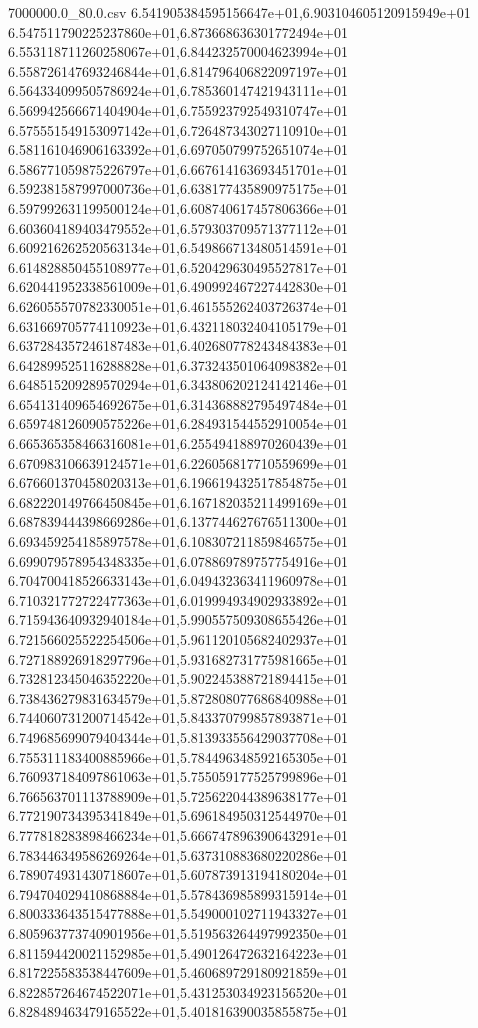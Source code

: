 \begin{filecontents*}{7000000.0_80.0.csv}
6.541905384595156647e+01,6.903104605120915949e+01
6.547511790225237860e+01,6.873668636301772494e+01
6.553118711260258067e+01,6.844232570004623994e+01
6.558726147693246844e+01,6.814796406822097197e+01
6.564334099505786924e+01,6.785360147421943111e+01
6.569942566671404904e+01,6.755923792549310747e+01
6.575551549153097142e+01,6.726487343027110910e+01
6.581161046906163392e+01,6.697050799752651074e+01
6.586771059875226797e+01,6.667614163693451701e+01
6.592381587997000736e+01,6.638177435890975175e+01
6.597992631199500124e+01,6.608740617457806366e+01
6.603604189403479552e+01,6.579303709571377112e+01
6.609216262520563134e+01,6.549866713480514591e+01
6.614828850455108977e+01,6.520429630495527817e+01
6.620441952338561009e+01,6.490992467227442830e+01
6.626055570782330051e+01,6.461555262403726374e+01
6.631669705774110923e+01,6.432118032404105179e+01
6.637284357246187483e+01,6.402680778243484383e+01
6.642899525116288828e+01,6.373243501064098382e+01
6.648515209289570294e+01,6.343806202124142146e+01
6.654131409654692675e+01,6.314368882795497484e+01
6.659748126090575226e+01,6.284931544552910054e+01
6.665365358466316081e+01,6.255494188970260439e+01
6.670983106639124571e+01,6.226056817710559699e+01
6.676601370458020313e+01,6.196619432517854875e+01
6.682220149766450845e+01,6.167182035211499169e+01
6.687839444398669286e+01,6.137744627676511300e+01
6.693459254185897578e+01,6.108307211859846575e+01
6.699079578954348335e+01,6.078869789757754916e+01
6.704700418526633143e+01,6.049432363411960978e+01
6.710321772722477363e+01,6.019994934902933892e+01
6.715943640932940184e+01,5.990557509308655426e+01
6.721566025522254506e+01,5.961120105682402937e+01
6.727188926918297796e+01,5.931682731775981665e+01
6.732812345046352220e+01,5.902245388721894415e+01
6.738436279831634579e+01,5.872808077686840988e+01
6.744060731200714542e+01,5.843370799857893871e+01
6.749685699079404344e+01,5.813933556429037708e+01
6.755311183400885966e+01,5.784496348592165305e+01
6.760937184097861063e+01,5.755059177525799896e+01
6.766563701113788909e+01,5.725622044389638177e+01
6.772190734395341849e+01,5.696184950312544970e+01
6.777818283898466234e+01,5.666747896390643291e+01
6.783446349586269264e+01,5.637310883680220286e+01
6.789074931430718607e+01,5.607873913194180204e+01
6.794704029410868884e+01,5.578436985899315914e+01
6.800333643515477888e+01,5.549000102711943327e+01
6.805963773740901956e+01,5.519563264497992350e+01
6.811594420021152985e+01,5.490126472632164223e+01
6.817225583538447609e+01,5.460689729180921859e+01
6.822857264674522071e+01,5.431253034923156520e+01
6.828489463479165522e+01,5.401816390035855875e+01

\end{filecontents*}
